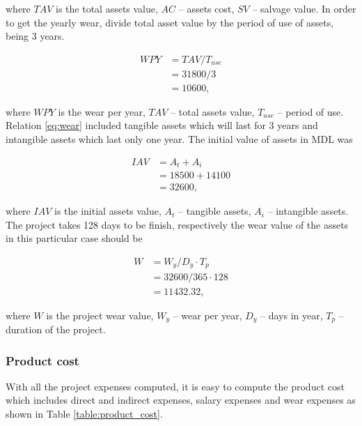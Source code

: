 \noindent
where $TAV$ is the total assets value, $AC$ -- assets cost, $SV$ -- salvage value. In order to get the yearly wear, divide total asset value by the period of use of assets, being 3 years.

\begin{equation} \label{eq:wear}
 \begin{split}
  WPY &= TAV / T_{use} \\
                &= 31800/3\\
                &= 10600,
 \end{split}
\end{equation}

\noindent
where $WPY$ is the wear per year, $TAV$ -- total assets value, $T_{use}$ -- period of use. Relation \eqref{eq:wear} included tangible assets which will last for 3 years and intangible assets which last only one year. The initial value of assets in MDL was

\begin{equation}
 \begin{split}
 IAV &= A_t + A_i \\
 &= 18500 + 14100 \\
 &= 32600,
 \end{split}
\end{equation}

\noindent
where $IAV$ is the initial assets value, $A_t$ -- tangible assets, $A_i$ -- intangible assets. The project takes 128 days to be finish, respectively the wear value of the assets in this particular case should be

\begin{equation}
 \begin{split}
  W &= W_y / D_y \cdot T_p\\
                   &= 32600  / 365  \cdot 128 \\
                   &= 11432.32 ,
 \end{split}
\end{equation}

\noindent
where $W$ is the project wear value, $W_y$ -- wear per year, $D_y$ -- days in year, $T_p$ -- duration of the project.

\subsubsection{Product cost}
With all the project expenses computed, it is easy to compute the product cost which includes direct and indirect expenses, salary expenses and wear expenses as shown in Table \ref{table:product_cost}.

